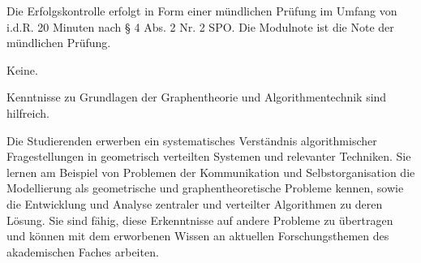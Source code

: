 \begin{module}

\setdoclanguagegerman
{}
\modulesubject{}





\modulehead


\label{mod_2933.dp_997}



\begin{styleenv}
\begin{assessment}
Die Erfolgskontrolle erfolgt in Form einer mündlichen Prüfung im Umfang von i.d.R. 20 Minuten nach § 4 Abs. 2 Nr. 2 SPO.\newline
Die Modulnote ist die Note der mündlichen Prüfung.


\end{assessment}

\begin{conditions}Keine.\end{conditions}

\begin{recommendations}Kenntnisse zu Grundlagen der Graphentheorie und Algorithmentechnik sind hilfreich.

\end{recommendations}
\end{styleenv}

\begin{learningoutcomes}
Die Studierenden erwerben ein systematisches Verständnis algorithmischer Fragestellungen in geometrisch verteilten Systemen und relevanter Techniken. Sie lernen am Beispiel von Problemen der Kommunikation und Selbstorganisation die Modellierung als geometrische und graphentheoretische Probleme kennen, sowie die Entwicklung und Analyse zentraler und verteilter Algorithmen zu deren Lösung. Sie sind fähig, diese Erkenntnisse auf andere Probleme zu übertragen und können mit dem erworbenen Wissen an aktuellen Forschungsthemen des akademischen Faches arbeiten.



\end{learningoutcomes}
\end{module}
